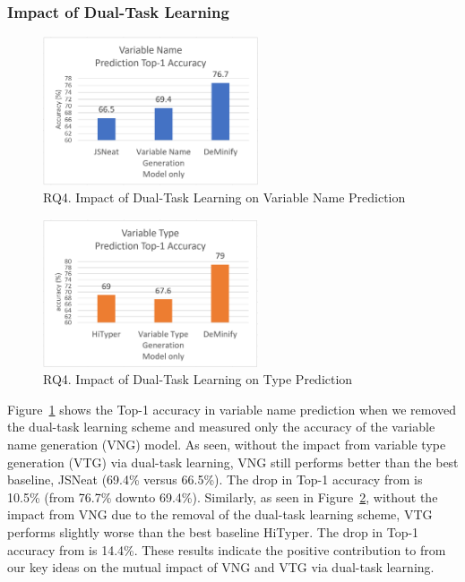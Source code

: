 \subsubsection{Impact of Dual-Task Learning}
\label{sec:dual-task-result}


\begin{figure}[t]%
\begin{center}
\includegraphics[width=2.5in]{figures/dual-task-result-11}
\vspace{-8pt}
\caption{RQ4. Impact of Dual-Task Learning on Variable Name Prediction}
\label{dual-task-result-1}
\end{center}
\end{figure}

\begin{figure}[t]%
\begin{center}
\includegraphics[width=2.5in]{figures/dual-task-result-22}
\vspace{-8pt}
\caption{RQ4. Impact of Dual-Task Learning on Type Prediction}
\label{dual-task-result-2}
\end{center}
\end{figure}

Figure~\ref{dual-task-result-1} shows the Top-1 accuracy in variable
name prediction when we removed the dual-task learning scheme and
measured only the accuracy of the variable name generation (VNG)
model.  As seen, without the impact from variable type generation
(VTG) via dual-task learning, VNG still performs better than the best
baseline, JSNeat (69.4\% versus 66.5\%). The drop in Top-1 accuracy
from {\tool} is 10.5\% (from 76.7\% downto 69.4\%). Similarly, as seen
in Figure~\ref{dual-task-result-2}, without the impact from VNG due to
the removal of the dual-task learning scheme, VTG performs slightly
worse than the best baseline HiTyper. The drop in Top-1 accuracy from
{\tool} is 14.4\%.  These results indicate the positive contribution to {\tool}
from our key ideas on the mutual impact of VNG and VTG via dual-task
learning.
